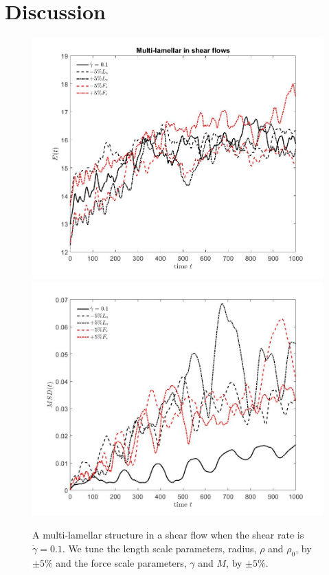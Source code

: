 \documentclass[aps,prl,preprint,groupedaddress]{revtex4-2}
\begin{document}
\section{Discussion}
\begin{figure}
  \begin{center}
  \includegraphics[height=0.2\textheight]{multilamellar_shear0p1_Energy_LsFs}
    \includegraphics[height=0.2\textheight]{multilamellar_shear0p1_MSD_LsFs}
  \end{center}
    \caption{ A multi-lamellar structure in a shear flow when the shear rate is $\dot\gamma=0.1$. We tune the length scale parameters, radius, $\rho$ and $\rho_0$, by $\pm 5\%$ and the force scale parameters, $\gamma$ and $M$, by $\pm 5\%$.    }
\end{figure}
\end{document}
